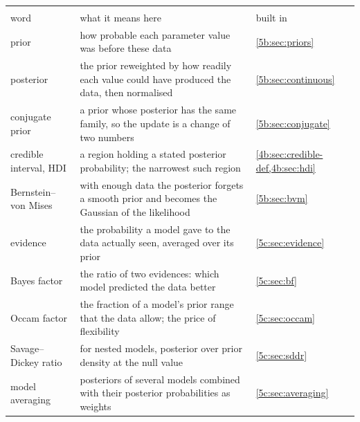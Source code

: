 \begin{center}
\small
\renewcommand{\arraystretch}{1.18}
\begin{tabularx}{\linewidth}{@{}>{\raggedright\arraybackslash}p{3.0cm}
                               >{\raggedright\arraybackslash}X
                               >{\raggedright\arraybackslash}p{2.0cm}@{}}
\toprule
\multicolumn{3}{@{}l}{\textbf{The Bayesian objects}}\\
word & what it means here & built in\\\midrule
prior & how probable each parameter value was before these data & \cref{5b:sec:priors}\\
posterior & the prior reweighted by how readily each value could have produced the data, then normalised & \cref{5b:sec:continuous}\\
conjugate prior & a prior whose posterior has the same family, so the update is a change of two numbers & \cref{5b:sec:conjugate}\\
credible interval, HDI & a region holding a stated posterior probability; the narrowest such region & \cref{4b:sec:credible-def,4b:sec:hdi}\\
Bernstein--von Mises & with enough data the posterior forgets a smooth prior and becomes the Gaussian of the likelihood & \cref{5b:sec:bvm}\\
evidence & the probability a model gave to the data actually seen, averaged over its prior & \cref{5c:sec:evidence}\\
Bayes factor & the ratio of two evidences: which model predicted the data better & \cref{5c:sec:bf}\\
Occam factor & the fraction of a model's prior range that the data allow; the price of flexibility & \cref{5c:sec:occam}\\
Savage--Dickey ratio & for nested models, posterior over prior density at the null value & \cref{5c:sec:sddr}\\
model averaging & posteriors of several models combined with their posterior probabilities as weights & \cref{5c:sec:averaging}\\
\bottomrule
\end{tabularx}
\end{center}

